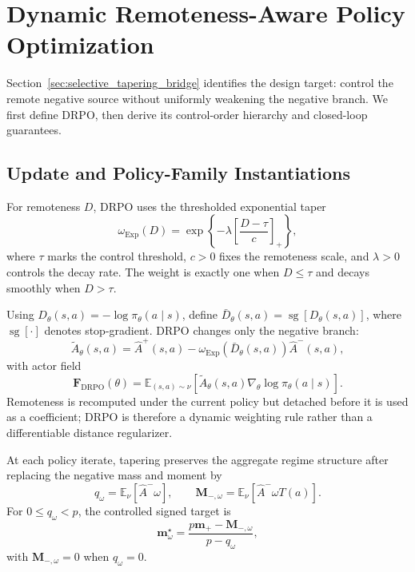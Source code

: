 \documentclass{article}
\theoremstyle{plain}
\theoremstyle{definition}
\theoremstyle{remark}
\begin{document}
\section{Dynamic Remoteness-Aware Policy Optimization}
\label{sec:drpo}

Section~\ref{sec:selective_tapering_bridge} identifies the design target:
control the remote negative source without uniformly weakening the negative
branch. We first define DRPO, then derive its control-order hierarchy and
closed-loop guarantees.

\subsection{Update and Policy-Family Instantiations}
\label{subsec:drpo_update}

For remoteness \(D\), DRPO uses the thresholded exponential taper
\begin{equation}
    \omega_{\mathrm{Exp}}(D)
    =
    \exp
    \left\{
        -\lambda
        \left[
            \frac{D-\tau}{c}
        \right]_{+}
    \right\},
    \label{eq:drpo_exp_weight}
\end{equation}
where \(\tau\) marks the control threshold, \(c>0\) fixes the remoteness
scale, and \(\lambda>0\) controls the decay rate. The weight is exactly one
when \(D\leq\tau\) and decays smoothly when \(D>\tau\).

Using \(D_\theta(s,a)=-\log\pi_\theta(a\mid s)\), define
\(\bar D_\theta(s,a)=\operatorname{sg}[D_\theta(s,a)]\), where
\(\operatorname{sg}[\cdot]\) denotes stop-gradient. DRPO changes only the
negative branch:
\begin{equation}
    \widetilde A_{\theta}(s,a)
    =
    \widehat A^{+}(s,a)
    -
    \omega_{\mathrm{Exp}}
    \!\left(\bar D_\theta(s,a)\right)
    \widehat A^{-}(s,a),
    \label{eq:drpo_effective_advantage}
\end{equation}
with actor field
\begin{equation}
    \mathbf F_{\mathrm{DRPO}}(\theta)
    =
    \mathbb E_{(s,a)\sim\nu}
    \left[
        \widetilde A_{\theta}(s,a)
        \nabla_\theta\log\pi_\theta(a\mid s)
    \right].
    \label{eq:drpo_actor_field}
\end{equation}
Remoteness is recomputed under the current policy but detached before it is
used as a coefficient; DRPO is therefore a dynamic weighting rule rather than
a differentiable distance regularizer.

At each policy iterate, tapering preserves the aggregate regime structure
after replacing the negative mass and moment by
\[
q_\omega=\mathbb E_\nu[\widehat A^-\omega],
\qquad
\mathbf M_{-,\omega}=\mathbb E_\nu[\widehat A^-\omega T(a)].
\]
For \(0\le q_\omega<p\), the controlled signed target is
\[
\mathbf m_\omega^\star
=
\frac{p\mathbf m_+-\mathbf M_{-,\omega}}{p-q_\omega},
\]
with \(\mathbf M_{-,\omega}=0\) when \(q_\omega=0\).
\end{document}
